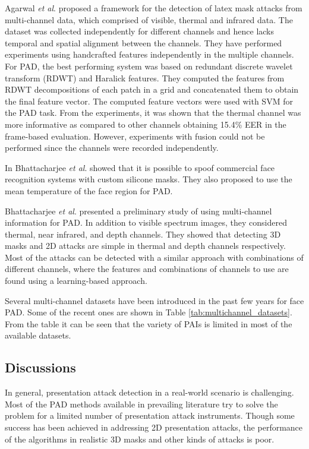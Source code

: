 \documentclass[journal]{IEEEtran}
\begin{document}
Agarwal \textit{et al}. \cite{agarwal2017face} proposed a framework for the detection of latex mask attacks from multi-channel data, which comprised of visible, thermal and infrared data. The dataset was collected independently for different channels and hence lacks temporal and spatial alignment between the channels.  They have performed experiments using handcrafted features independently in the multiple channels. For PAD, the best performing system was based on redundant discrete wavelet transform (RDWT) and Haralick \cite{haralick1979statistical} features. They computed the features from RDWT decompositions of each patch in a  grid and concatenated them to obtain the final feature vector. The computed feature vectors were used with SVM for the PAD task.  From the experiments, it was shown that the thermal channel was more informative as compared to other channels obtaining 15.4\% EER in the frame-based evaluation. However, experiments with fusion could not be performed since the channels were recorded independently.

In \cite{Bhattacharjee:256262} Bhattacharjee \textit{et al}. showed that it is possible to spoof commercial face recognition systems with
custom silicone masks. They also proposed to use the mean temperature of the face region for PAD.

Bhattacharjee \textit{et al}. \cite{bhattacharjee2017you} presented a preliminary study of using multi-channel information for PAD. In addition to visible spectrum images, they considered thermal, near infrared, and depth channels.  They showed that detecting 3D masks and 2D attacks are simple in thermal and depth channels respectively. Most of the attacks can be detected with a similar approach with combinations of different channels, where the features and combinations of channels to use are found using a learning-based approach.

Several multi-channel datasets have been introduced in the past few years for face PAD.
Some of the recent ones are shown in Table \ref{tab:multichannel_datasets}. From the
table it can be seen that the variety of PAIs is limited in most of the available datasets.

\subsection{Discussions}

In general, presentation attack detection in a real-world scenario is challenging. Most of the PAD methods available in prevailing literature try to solve the problem for a limited number of presentation attack instruments. Though some success has been achieved in addressing 2D presentation attacks, the performance of the algorithms in realistic 3D masks and other kinds of attacks is poor.
\end{document}
